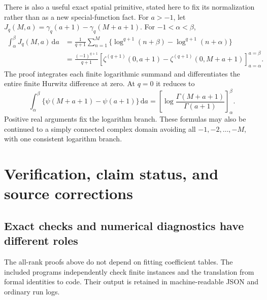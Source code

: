 \documentclass[11pt,letterpaper]{article}
\numberwithin{equation}{section}
\theoremstyle{definition}\newtheorem{definition}[theorem]{Definition}
\theoremstyle{remark}\newtheorem{remark}[theorem]{Remark}
\newcommand{\dd}{\,\mathrm d}\newcommand{\Li}{\operatorname{Li}}
\begin{document}
There is also a useful exact spatial primitive, stated here to fix its
normalization rather than as a new special-function fact. For $a>-1$,
let $J_q(M,a)=\gamma_q(a+1)-\gamma_q(M+a+1)$. For
$-1<\alpha<\beta$,
\begin{equation}\label{eq:spatialprimitive}
 \begin{split}
 \int_\alpha^\beta J_q(M,a)\dd a
 &=\frac1{q+1}\sum_{n=1}^M
            \{\log^{q+1}(n+\beta)-\log^{q+1}(n+\alpha)\}\\
 &=\frac{(-1)^{q+1}}{q+1}\left[
    \zeta^{(q+1)}(0,a+1)-\zeta^{(q+1)}(0,M+a+1)
                         \right]_{a=\alpha}^{a=\beta}.
 \end{split}
\end{equation}
The proof integrates each finite logarithmic summand and differentiates
the entire finite Hurwitz difference at zero. At $q=0$ it reduces to
\begin{equation}\label{eq:gammalogprimitive}
 \int_\alpha^\beta\{\psi(M+a+1)-\psi(a+1)\}\dd a
       =\left[\log\frac{\Gamma(M+a+1)}{\Gamma(a+1)}
                                                 \right]_\alpha^\beta.
\end{equation}
Positive real arguments fix the logarithm branch. These formulas may
also be continued to a simply connected complex domain avoiding all
$-1,-2,\ldots,-M$, with one consistent logarithm branch.

\section{Verification, claim status, and source corrections}
\label{sec:verification}

\subsection{Exact checks and numerical diagnostics have different roles}

The all-rank proofs above do not depend on fitting coefficient tables.
The included programs independently check finite instances and the
translation from formal identities to code. Their output is retained
in machine-readable JSON and ordinary run logs.
\end{document}
